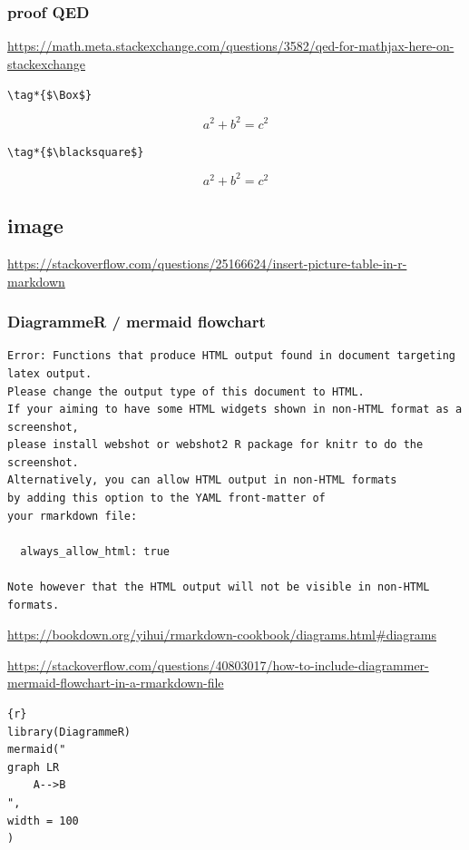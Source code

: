 \documentclass[
]{book}
\theoremstyle{definition}
\theoremstyle{definition}
\theoremstyle{definition}
\theoremstyle{definition}
\theoremstyle{remark}
\begin{document}
\subsubsection{proof QED}\label{proof-qed}

\url{https://math.meta.stackexchange.com/questions/3582/qed-for-mathjax-here-on-stackexchange}

\texttt{\textbackslash{}tag*\{\$\textbackslash{}Box\$\}}

\[
a^2+b^2=c^2 \tag*{$\Box$}
\]

\texttt{\textbackslash{}tag*\{\$\textbackslash{}blacksquare\$\}}

\[
a^2+b^2=c^2 \tag*{$\blacksquare$}
\]

\subsection{image}\label{image}

\url{https://stackoverflow.com/questions/25166624/insert-picture-table-in-r-markdown}

\subsubsection{DiagrammeR / mermaid flowchart}\label{diagrammer-mermaid-flowchart}

\begin{verbatim}
Error: Functions that produce HTML output found in document targeting latex output.
Please change the output type of this document to HTML.
If your aiming to have some HTML widgets shown in non-HTML format as a screenshot,
please install webshot or webshot2 R package for knitr to do the screenshot.
Alternatively, you can allow HTML output in non-HTML formats
by adding this option to the YAML front-matter of
your rmarkdown file:

  always_allow_html: true

Note however that the HTML output will not be visible in non-HTML formats.
\end{verbatim}

\url{https://bookdown.org/yihui/rmarkdown-cookbook/diagrams.html\#diagrams}

\url{https://stackoverflow.com/questions/40803017/how-to-include-diagrammer-mermaid-flowchart-in-a-rmarkdown-file}

\begin{verbatim}
{r}
library(DiagrammeR)
mermaid("
graph LR
    A-->B
",
width = 100
)
\end{verbatim}
\end{document}

